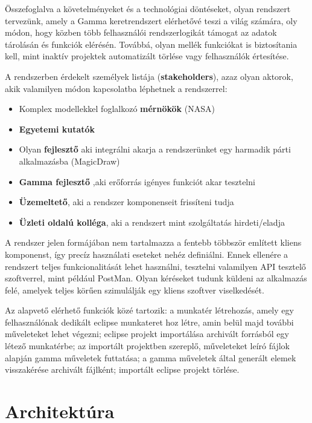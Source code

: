 Összefoglalva a követelményeket és a technológiai döntéseket, olyan rendszert tervezünk, amely a Gamma keretrendszert elérhetővé teszi a világ számára, oly módon, hogy közben több felhasználói rendszerlogikát támogat az adatok tárolásán és funkciók elérésén. Továbbá, olyan mellék funkciókat is biztosítania kell, mint inaktív projektek automatizált törlése vagy felhasználók értesítése.

A rendszerben érdekelt személyek listája (\textbf{stakeholders}), azaz olyan aktorok, akik valamilyen módon kapcsolatba léphetnek a rendszerrel:
\begin{itemize}
	\item Komplex modellekkel foglalkozó \textbf{mérnökök} (NASA)
	\item \textbf{Egyetemi kutatók}
	\item Olyan \textbf{fejlesztő} aki integrálni akarja a rendszerünket egy harmadik párti alkalmazásba (MagicDraw)
	\item \textbf{Gamma fejlesztő} ,aki erőforrás igényes funkciót akar tesztelni
	\item \textbf{Üzemeltető}, aki a rendszer komponenseit frissíteni tudja
	\item \textbf{Üzleti oldalú kolléga}, aki a rendszert mint szolgáltatás hirdeti/eladja
\end{itemize}

A rendszer jelen formájában nem tartalmazza a fentebb többször említett kliens komponenst, így precíz használati eseteket nehéz definiálni. Ennek ellenére a rendszert teljes funkcionalitását lehet használni, tesztelni valamilyen API tesztelő szoftverrel, mint például PostMan. Olyan kéréseket tudunk küldeni az alkalmazás felé, amelyek teljes körűen szimulálják egy kliens szoftver viselkedését.

Az alapvető elérhető funkciók közé tartozik: a munkatér létrehozás, amely egy felhasználónak dedikált eclipse munkateret hoz létre, amin belül majd további műveleteket lehet végezni; eclipse projekt importálása archivált forrásból egy létező munkatérbe; az importált projektben szereplő, műveleteket leíró fájlok alapján gamma műveletek futtatása; a gamma műveletek által generált elemek visszakérése archivált fájlként; importált eclipse projekt törlése.


\section{Architektúra}
